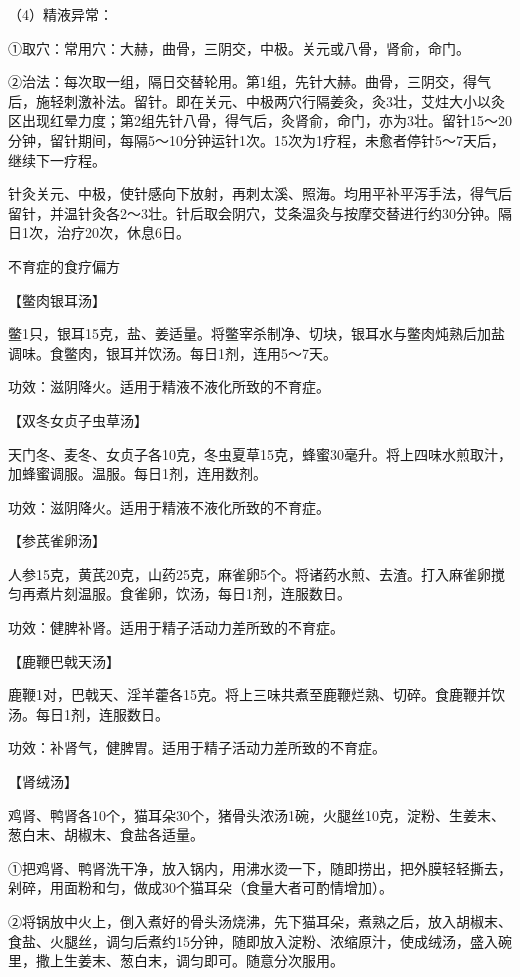 \documentclass[12pt,UTF8,openany]{ctexbook}
\begin{document}
（4）精液异常：

①取穴：常用穴：大赫，曲骨，三阴交，中极。关元或八骨，肾俞，命门。

②治法：每次取一组，隔日交替轮用。第1组，先针大赫。曲骨，三阴交，得气后，施轻刺激补法。留针。即在关元、中极两穴行隔姜灸，灸3壮，艾炷大小以灸区出现红晕力度；第2组先针八骨，得气后，灸肾俞，命门，亦为3壮。留针15～20分钟，留针期间，每隔5～10分钟运针1次。15次为1疗程，未愈者停针5～7天后，继续下一疗程。

针灸关元、中极，使针感向下放射，再刺太溪、照海。均用平补平泻手法，得气后留针，并温针灸各2～3壮。针后取会阴穴，艾条温灸与按摩交替进行约30分钟。隔日1次，治疗20次，休息6日。





不育症的食疗偏方


【鳖肉银耳汤】

鳖1只，银耳15克，盐、姜适量。将鳖宰杀制净、切块，银耳水与鳖肉炖熟后加盐调味。食鳖肉，银耳并饮汤。每日1剂，连用5～7天。

功效：滋阴降火。适用于精液不液化所致的不育症。

【双冬女贞子虫草汤】

天门冬、麦冬、女贞子各10克，冬虫夏草15克，蜂蜜30毫升。将上四味水煎取汁，加蜂蜜调服。温服。每日1剂，连用数剂。

功效：滋阴降火。适用于精液不液化所致的不育症。

【参芪雀卵汤】

人参15克，黄芪20克，山药25克，麻雀卵5个。将诸药水煎、去渣。打入麻雀卵搅匀再煮片刻温服。食雀卵，饮汤，每日1剂，连服数日。

功效：健脾补肾。适用于精子活动力差所致的不育症。

【鹿鞭巴戟天汤】

鹿鞭1对，巴戟天、淫羊藿各15克。将上三味共煮至鹿鞭烂熟、切碎。食鹿鞭并饮汤。每日1剂，连服数日。

功效：补肾气，健脾胃。适用于精子活动力差所致的不育症。

【肾绒汤】

鸡肾、鸭肾各10个，猫耳朵30个，猪骨头浓汤1碗，火腿丝10克，淀粉、生姜末、葱白末、胡椒末、食盐各适量。

①把鸡肾、鸭肾洗干净，放入锅内，用沸水烫一下，随即捞出，把外膜轻轻撕去，剁碎，用面粉和匀，做成30个猫耳朵（食量大者可酌情增加）。

②将锅放中火上，倒入煮好的骨头汤烧沸，先下猫耳朵，煮熟之后，放入胡椒末、食盐、火腿丝，调匀后煮约15分钟，随即放入淀粉、浓缩原汁，使成绒汤，盛入碗里，撒上生姜末、葱白末，调匀即可。随意分次服用。
\end{document}
